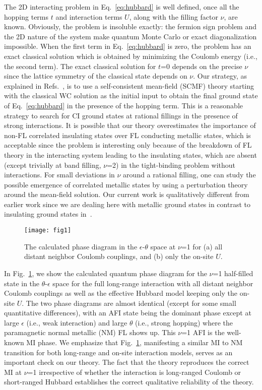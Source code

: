 \documentclass[aps,prl,floatfix,twocolumn]{revtex4-2}
\begin{document}
The 2D interacting problem in Eq.~\eqref{eq:hubbard} is well defined, once all the hopping terms $ t $ and interaction terms $ U $, along with the filling factor $\nu$, are known.  
Obviously, the problem is insoluble {exactly}: {the fermion sign problem and} the 2D nature of the system make {quantum Monte Carlo or exact diagonalization impossible}.
{When} the first term in Eq.~\eqref{eq:hubbard} is zero, the problem has an exact classical solution which is obtained by minimizing the Coulomb energy (i.e., the second term).  The exact classical solution for $ t $=0 depends on the precise {$\nu$} since the lattice symmetry of the classical state depends on {$\nu$}.  Our strategy, as explained in Refs.~, is to use a self-consistent mean-field {(SCMF)} theory starting with the classical WC solution as the initial input to obtain the final ground state of Eq.~\eqref{eq:hubbard} in the presence of {the hopping term}.  This is a reasonable strategy to search for {CI} ground states at rational fillings in the presence of strong interactions. It is possible that our theory overestimates the importance of non-{FL} correlated insulating states over {FL} conducting metallic states, which is acceptable since the problem is {interesting} only because of the breakdown of {FL} theory in the interacting system leading to the insulating states, which are absent (except trivially at band filling, $\nu$=2) in the tight-binding problem without interactions. For small deviations in $ \nu $ around a rational filling, one can study the possible emergence of correlated metallic states by using a perturbation theory around the mean-field solution. {Our current work is qualitatively different from earlier work since we are dealing here with metallic ground states in contrast to insulating ground states in~\cite{pan2020band,pan2020quantum}}.
\begin{figure}[t]
	\centering
	\texttt{[image: fig1]}
	\caption{The calculated phase diagram in the $ \epsilon $-$ \theta $ space at $ \nu $=1 for (a) all distant neighbor Coulomb couplings, and (b) only the on-site $ U $.}
	\label{fig:fig1}
\end{figure}

In Fig.~\ref{fig:fig1}, we show the calculated quantum phase diagram for the $\nu$=1 half-filled state in the $\theta$-$\epsilon$ space for the full long-range interaction with all distant neighbor Coulomb couplings as well as the effective Hubbard model keeping only the on-site {$ U $}. The two phase diagrams are almost identical (except for some small quantitative differences), with an AFI state being the dominant phase except at large $\epsilon$ (i.e., weak interaction) and large $\theta$ (i.e., strong hopping) where the paramagnetic normal metallic (NM) {FL} shows up.  This $\nu$=1 AFI is the well-known MI phase. We emphasize that Fig.~\ref{fig:fig1}, manifesting a similar MI to NM transition for both long-range and on-site interaction models, serves as an important check on our theory. The fact that the theory reproduces the correct {MI} at $\nu$=1 irrespective of whether the interaction is long-ranged Coulomb or short-ranged Hubbard establishes the correct qualitative reliability of the theory.
\end{document}
